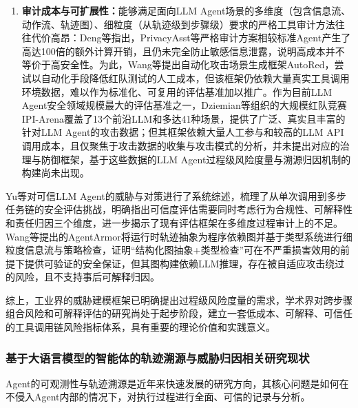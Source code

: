 \begin{enumerate}
  \item \textbf{审计成本与可扩展性：}能够满足面向LLM Agent场景的多维度（包含信息流、动作流、轨迹图）、细粒度（从轨迹级到步骤级）要求的严格工具审计方法往往代价高昂：Deng等\cite{deng2025agentsunderthreat}指出，PrivacyAsst\cite{zhang2024privacyasst}等严格审计方案相较标准Agent产生了高达100倍的额外计算开销，且仍未完全防止敏感信息泄露，说明高成本并不等价于高安全性。为此，Wang等\cite{wang2024autored}提出自动化攻击场景生成框架AutoRed，尝试以自动化手段降低红队测试的人工成本，但该框架仍依赖大量真实工具调用环境数据，难以作为标准化、可复用的评估基准加以推广。作为目前LLM Agent安全领域规模最大的评估基准之一，Dziemian等\cite{dziemian2026vulnerable}组织的大规模红队竞赛IPI-Arena覆盖了13个前沿LLM和多达41种场景，提供了广泛、真实且丰富的针对LLM Agent的攻击数据；但其框架依赖大量人工参与和较高的LLM API调用成本，且仅聚焦于攻击数据的收集与攻击模式的分析，并未提出对应的治理与防御框架，基于这些数据的LLM Agent过程级风险度量与溯源归因机制的构建尚未出现。
\end{enumerate}

Yu等\cite{yu2025survey}对可信LLM Agent的威胁与对策进行了系统综述，梳理了从单次调用到多步任务链的安全评估挑战，明确指出可信度评估需要同时考虑行为合规性、可解释性和责任归因三个维度，进一步揭示了现有评估框架在多维度过程审计上的不足。Wang等\cite{wang2025agentarmor}提出的AgentArmor将运行时轨迹抽象为程序依赖图并基于类型系统进行细粒度信息流与策略检查，证明“结构化图抽象+类型检查”可在不严重损害效用的前提下提供可验证的安全保证，但其图构建依赖LLM推理，存在被自适应攻击绕过的风险，且不支持事后可解释归因。

综上，工业界的威胁建模框架已明确提出过程级风险度量的需求，学术界对跨步骤组合风险和可解释评估的研究尚处于起步阶段，建立一套低成本、可解释、可信任的工具调用链风险指标体系，具有重要的理论价值和实践意义。

\subsubsection{基于大语言模型的智能体的轨迹溯源与威胁归因相关研究现状}

Agent的可观测性与轨迹溯源是近年来快速发展的研究方向，其核心问题是如何在不侵入Agent内部的情况下，对执行过程进行全面、可信的记录与分析。


